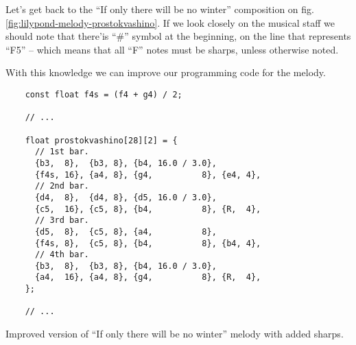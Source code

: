 \documentclass[../sparc.tex]{subfiles}
\begin{document}
Let's get back to the ``If only there will be no winter'' composition on
fig. \ref{fig:lilypond-melody-prostokvashino}.  If we look closely on the
musical staff we should note that there'is ``\#'' symbol at the beginning, on
the line that represents ``F5'' -- which means that all ``F'' notes must be
sharps, unless otherwise noted.


With this knowledge we can improve our programming code for the melody.

\begin{listing}[ht]
  \begin{verbatim}
    const float f4s = (f4 + g4) / 2;

    // ...

    float prostokvashino[28][2] = {
      // 1st bar.
      {b3,  8},  {b3, 8}, {b4, 16.0 / 3.0},
      {f4s, 16}, {a4, 8}, {g4,          8}, {e4, 4},
      // 2nd bar.
      {d4,  8},  {d4, 8}, {d5, 16.0 / 3.0},
      {c5,  16}, {c5, 8}, {b4,          8}, {R,  4},
      // 3rd bar.
      {d5,  8},  {c5, 8}, {a4,          8},
      {f4s, 8},  {c5, 8}, {b4,          8}, {b4, 4},
      // 4th bar.
      {b3,  8},  {b3, 8}, {b4, 16.0 / 3.0},
      {a4,  16}, {a4, 8}, {g4,          8}, {R,  4},
    };

    // ...
  \end{verbatim}
  \label{listing:prostokvashino-with-shaprs}
  \caption{Improved version of ``If only there will be no winter'' melody with
    added sharps.}
\end{listing}
\end{document}
